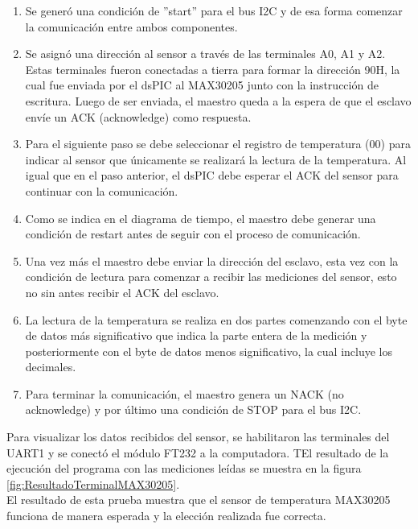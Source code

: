 \begin{enumerate}
	\item Se generó una condición de ''start'' para el bus I2C y de esa forma comenzar la comunicación entre ambos componentes.
	\item Se asignó una dirección al sensor a través de las terminales A0, A1 y A2. Estas terminales fueron conectadas a tierra para formar la dirección 90H, la cual fue enviada por el dsPIC al MAX30205 junto con la instrucción de escritura. Luego de ser enviada, el maestro queda a la espera de que el esclavo envíe un ACK (acknowledge) como respuesta.
	\item Para el siguiente paso se debe seleccionar el registro de temperatura (00) para indicar al sensor que únicamente se realizará la lectura de la temperatura. Al igual que en el paso anterior, el dsPIC debe esperar el ACK del sensor para continuar con la comunicación.
	\item Como se indica en el diagrama de tiempo, el maestro debe generar una condición de restart antes de seguir con el proceso de comunicación. 
	\item Una vez más el maestro debe enviar la dirección del esclavo, esta vez con la condición de lectura para comenzar a recibir las mediciones del sensor, esto no sin antes recibir el ACK del esclavo.
	\item La lectura de la temperatura se realiza en dos partes comenzando con el byte de datos más significativo que indica la parte entera de la medición y posteriormente con el byte de datos menos significativo, la cual incluye los decimales.
	\item Para terminar la comunicación, el maestro genera un NACK (no acknowledge) y por último una condición de STOP para el bus I2C.
\end{enumerate}



Para visualizar los datos recibidos del sensor, se habilitaron las terminales del UART1 y se conectó el módulo FT232 a la computadora. 
TEl resultado de la ejecución del programa con las mediciones leídas se muestra en la figura \ref{fig:ResultadoTerminalMAX30205}.\\
%
%

El resultado de esta prueba muestra que el sensor de temperatura MAX30205 funciona de manera esperada y la elección realizada fue correcta.

\clearpage